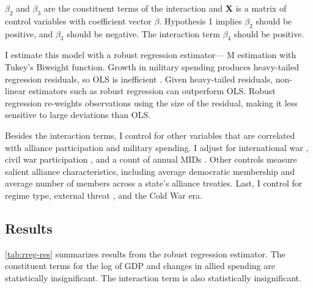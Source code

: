 \documentclass[12pt]{article}
\begin{document}
$\beta_2$ and $\beta_3$ are the constituent terms of the interaction and \textbf{X} is a matrix of control variables with coefficient vector $\beta$.
Hypothesis 1 implies $\beta_2$ should be positive, and $\beta_3$ should be negative. 
The interaction term $\beta_4$ should be positive. 


I estimate this model with a robust regression estimator--- M estimation with Tukey's Biweight function. 
Growth in military spending produces heavy-tailed regression residuals, so OLS is inefficient \citep{RaineyBaissa2018}. 
Given heavy-tailed residuals, non-linear estimators such as robust regression can outperform OLS. 
Robust regression re-weights observations using the size of the residual, making it less sensitive to large deviations than OLS. 


Besides the interaction terms, I control for other variables that are correlated with alliance participation and military spending. 
I adjust for international war \citep{Reiteretal2016}, civil war participation \citep{SarkeesWayman2010}, and a count of annual MIDs \citep{Gibleretal2016}. 
Other controls measure salient alliance characteristics, including average democratic membership \citep{DigiuseppePoast2016} and average number of members across a state's alliance treaties.   
Last, I control for regime type, external threat \citep{LeedsSavun2007}, and the Cold War era. 


\subsection{Results}

 
\autoref{tab:rreg-res} summarizes results from the robust regression estimator. 
The constituent terms for the log of GDP and changes in allied spending are statistically insignificant. 
The interaction term is also statistically insignificant. 
\end{document}
